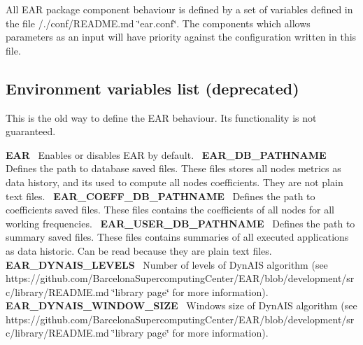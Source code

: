 All E\+AR package component behaviour is defined by a set of variables defined in the file /./conf/\+R\+E\+A\+D\+ME.md \char`\"{}ear.\+conf\char`\"{}. The components which allows parameters as an input will have priority against the configuration written in this file.

\subsection*{Environment variables list (deprecated) }

This is the old way to define the E\+AR behaviour. Its functionality is not guaranteed.

{\bfseries E\+AR}~\newline
 Enables or disables E\+AR by default.~\newline
 {\bfseries E\+A\+R\+\_\+\+D\+B\+\_\+\+P\+A\+T\+H\+N\+A\+ME}~\newline
 Defines the path to database saved files. These files stores all nodes metrics as data history, and its used to compute all nodes coefficients. They are not plain text files.~\newline
 {\bfseries E\+A\+R\+\_\+\+C\+O\+E\+F\+F\+\_\+\+D\+B\+\_\+\+P\+A\+T\+H\+N\+A\+ME}~\newline
 Defines the path to coefficients saved files. These files contains the coefficients of all nodes for all working frequencies.~\newline
 {\bfseries E\+A\+R\+\_\+\+U\+S\+E\+R\+\_\+\+D\+B\+\_\+\+P\+A\+T\+H\+N\+A\+ME}~\newline
 Defines the path to summary saved files. These files contains summaries of all executed applications as data historic. Can be read because they are plain text files.~\newline
 {\bfseries E\+A\+R\+\_\+\+D\+Y\+N\+A\+I\+S\+\_\+\+L\+E\+V\+E\+LS}~\newline
 Number of levels of Dyn\+A\+IS algorithm (see https\+://github.com/\+Barcelona\+Supercomputing\+Center/\+E\+A\+R/blob/development/src/library/\+R\+E\+A\+D\+M\+E.\+md \char`\"{}library page\char`\"{} for more information).~\newline
 {\bfseries E\+A\+R\+\_\+\+D\+Y\+N\+A\+I\+S\+\_\+\+W\+I\+N\+D\+O\+W\+\_\+\+S\+I\+ZE}~\newline
 Windows size of Dyn\+A\+IS algorithm (see https\+://github.com/\+Barcelona\+Supercomputing\+Center/\+E\+A\+R/blob/development/src/library/\+R\+E\+A\+D\+M\+E.\+md \char`\"{}library page\char`\"{} for more information).~\newline
